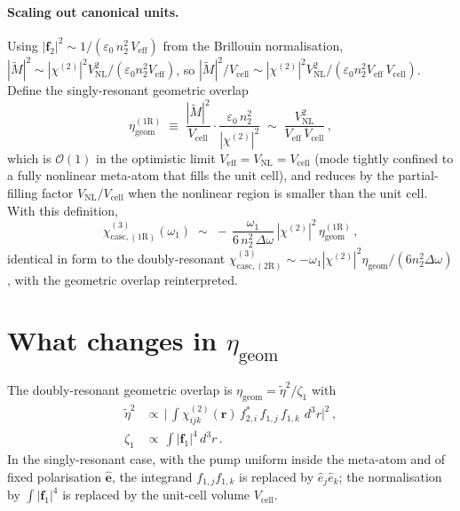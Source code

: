 \documentclass[11pt,a4paper]{article}
\newcommand{\eps}{\varepsilon}
\newcommand{\bvec}[1]{\mathbf{#1}}
\newcommand{\f}{\bvec{f}}
\newcommand{\ri}{\bvec{r}}
\newcommand{\dthreer}{\,d^{3}r}
\newcommand{\chitwo}{\chi^{(2)}}
\newcommand{\Dom}{\Delta\omega}
\newcommand{\chicascOneR}{\chi^{(3)}_{\text{casc},(1\mathrm R)}}
\newcommand{\chicascTwoR}{\chi^{(3)}_{\text{casc},(2\mathrm R)}}
\newcommand{\Vunit}{V_{\text{cell}}}
\newcommand{\VNL}{V_{\text{NL}}}
\newcommand{\Veff}{V_{\text{eff}}}
\begin{document}
\paragraph{Scaling out canonical units.}
Using $|\f_2|^{2}\sim 1/(\eps_0\,n_2^{2}\,\Veff)$ from the Brillouin
normalisation, $|\widetilde M|^{2}\sim|\chitwo|^{2}\VNL^{2}/(\eps_0 n_2^{2}\Veff)$,
so $|\widetilde M|^{2}/\Vunit\sim|\chitwo|^{2}\VNL^{2}/(\eps_0 n_2^{2}\Veff\,\Vunit)$.
Define the singly-resonant geometric overlap
\begin{equation}
  \eta_\text{geom}^{(1\mathrm R)}
   \;\equiv\;\frac{|\widetilde M|^{2}}{\Vunit}
              \cdot\frac{\eps_0\,n_2^{2}}{|\chitwo|^{2}}
   \;\sim\;\frac{\VNL^{2}}{\Veff\,\Vunit}\,,
  \label{eq:eta-1R-def}
\end{equation}
which is $\mathcal O(1)$ in the optimistic limit $\Veff=\VNL=\Vunit$ (mode
tightly confined to a fully nonlinear meta-atom that fills the unit
cell), and reduces by the partial-filling factor $\VNL/\Vunit$ when the
nonlinear region is smaller than the unit cell.  With this definition,
\begin{equation}
  \boxed{\;\chicascOneR(\omega_1)\;\sim\;
        -\,\frac{\omega_1}{6\,n_2^{2}\,\Dom}\,|\chitwo|^{2}\,
        \eta_\text{geom}^{(1\mathrm R)}\,,\;}
  \label{eq:chi3-1R-explicit}
\end{equation}
identical in form to the doubly-resonant
$\chicascTwoR\sim
-\omega_1|\chitwo|^{2}\eta_\text{geom}/(6 n_2^{2}\Dom)$, with the
geometric overlap reinterpreted.

\section{What changes in $\eta_\text{geom}$}\label{sec:eta-compare}

The doubly-resonant geometric overlap is
$\eta_\text{geom}=\widetilde\eta^{2}/\zeta_1$ with
\begin{align}
  \widetilde\eta^{2}
   &\propto\,\bigl|\,{\textstyle\int}\chitwo_{ijk}(\ri)\,
                       f_{2,i}^{*}\,f_{1,j}\,f_{1,k}\,\dthreer\bigr|^{2}\,,
   \\[2pt]
  \zeta_1
   &\propto\,{\textstyle\int}|\f_1|^{4}\dthreer\,.
\end{align}
In the singly-resonant case, with the pump uniform inside the meta-atom and
of fixed polarisation $\hat{\bm e}$, the integrand $f_{1,j}f_{1,k}$ is
replaced by $\hat e_j\hat e_k$; the normalisation by $\int|\f_1|^{4}$ is
replaced by the unit-cell volume $\Vunit$.
\end{document}
